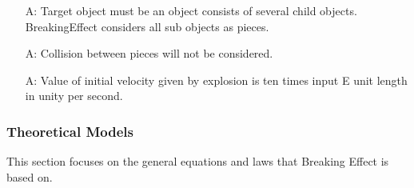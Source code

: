 \documentclass[12pt]{article}
\newcounter{assumpnum} %
\newcommand{\progname}{Breaking Effect} %
\begin{document}
\begin{itemize}
		\item[A\refstepcounter{assumpnum}\theassumpnum \label{A_piece}:]
		Target object must be an object consists of several child objects. BreakingEffect considers all sub objects as pieces.
		
		\item[A\refstepcounter{assumpnum}\theassumpnum \label{A_collision}:]
		Collision between pieces will not be considered. 
		
		\item[A\refstepcounter{assumpnum}\theassumpnum \label{A_velocity}:]
		Value of initial velocity given by explosion is ten times input E unit length in unity per second.
	\end{itemize}
	
	\subsubsection{Theoretical Models}\label{sec_theoretical}
	
	This section focuses on the general equations and laws that \progname{} is based
	on. 
	
	~\newline
	
\end{document}
